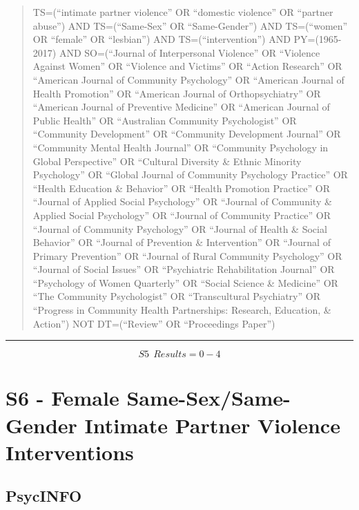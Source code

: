 \documentclass[]{tufte-handout}
\begin{document}
\begin{quote}
TS=(``intimate partner violence'' OR ``domestic violence'' OR ``partner
abuse'') AND TS=(``Same-Sex'' OR ``Same-Gender'') AND TS=(``women'' OR
``female'' OR ``lesbian'') AND TS=(``intervention'') AND PY=(1965-2017)
AND SO=(``Journal of Interpersonal Violence'' OR ``Violence Against
Women'' OR ``Violence and Victims'' OR ``Action Research'' OR ``American
Journal of Community Psychology'' OR ``American Journal of Health
Promotion'' OR ``American Journal of Orthopsychiatry'' OR ``American
Journal of Preventive Medicine'' OR ``American Journal of Public
Health'' OR ``Australian Community Psychologist'' OR ``Community
Development'' OR ``Community Development Journal'' OR ``Community Mental
Health Journal'' OR ``Community Psychology in Global Perspective'' OR
``Cultural Diversity \& Ethnic Minority Psychology'' OR ``Global Journal
of Community Psychology Practice'' OR ``Health Education \& Behavior''
OR ``Health Promotion Practice'' OR ``Journal of Applied Social
Psychology'' OR ``Journal of Community \& Applied Social Psychology'' OR
``Journal of Community Practice'' OR ``Journal of Community Psychology''
OR ``Journal of Health \& Social Behavior'' OR ``Journal of Prevention
\& Intervention'' OR ``Journal of Primary Prevention'' OR ``Journal of
Rural Community Psychology'' OR ``Journal of Social Issues'' OR
``Psychiatric Rehabilitation Journal'' OR ``Psychology of Women
Quarterly'' OR ``Social Science \& Medicine'' OR ``The Community
Psychologist'' OR ``Transcultural Psychiatry'' OR ``Progress in
Community Health Partnerships: Research, Education, \& Action'') NOT
DT=(``Review'' OR ``Proceedings Paper'')
\end{quote}

\begin{center}\rule{0.5\linewidth}{\linethickness}\end{center}

\[ S5~~Results = 0-4 \]

\newpage

\section{S6 - Female Same-Sex/Same-Gender Intimate Partner Violence
Interventions}\label{s6---female-same-sexsame-gender-intimate-partner-violence-interventions}

\subsection{PsycINFO}\label{psycinfo-5}
\end{document}
